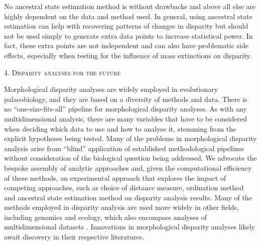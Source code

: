 \documentclass[12pt,letterpaper]{article}
\renewcommand{\section}[1]{%
\bigskip
\begin{center}
\begin{Large}
\normalfont\scshape #1
\medskip
\end{Large}
\end{center}}
\begin{document}
No ancestral state estimation method is without drawbacks
 and above all else are highly dependent on the data and method used.
In general, using ancestral state estimation can help with recovering patterns of changes in disparity but should not be used simply to generate extra data points to increase statistical power.
In fact, these extra points are not independent and can also have problematic side effects, especially when testing for the influence of mass extinctions on disparity.

\section{4. Disparity analyses for the future}

Morphological disparity analyses are widely employed in evolutionary palaeobiology, and they are based on a diversity of methods and data.
There is no ``one-size-fits-all'' pipeline for morphological disparity analyses.
As with any multidimensional analysis, there are many variables that have to be considered when deciding which data to use and how to analyse it, stemming from the explicit hypotheses being tested.
Many of the problems in morphological disparity analysis arise from ``blind'' application of established methodological pipelines without consideration of the biological question being addressed.
We advocate the bespoke
assembly of analytic approaches and, given the computational efficiency of these methods, an experimental approach that explores the impact of competing approaches, such as choice of distance measure, ordination method and ancestral state estimation method on disparity analysis results.
Many of the methods employed in disparity analysis are used more widely in other fields, including genomics and ecology, which also encompass analyses of multidimensional datasets
\citep{Donohue2013-bg, Saupe2015-vm, Canter2018-hk, mammola2019}
. %
Innovations in morphological disparity analyses likely await discovery in their respective literatures.
\end{document}
